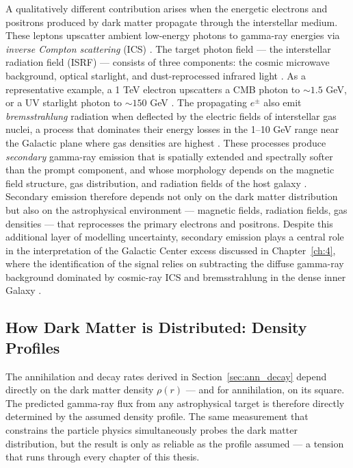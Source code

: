 A qualitatively different contribution arises when the energetic electrons and positrons produced by dark matter propagate through the interstellar medium.
These leptons upscatter ambient low-energy photons to gamma-ray energies via \textit{inverse Compton scattering} (ICS) \cite{Blumenthal:1970gc,Hooper:2024}.
The target photon field --- the interstellar radiation field (ISRF) --- consists of three components: the cosmic microwave background, optical starlight, and dust-reprocessed infrared light \cite{Strong:2007nh}.
As a representative example, a 1 TeV electron upscatters a CMB photon to $\sim 1.5$ GeV, or a UV starlight photon to $\sim 150$ GeV \cite{Cirelli:2024ssz}.
The propagating $e^\pm$ also emit \textit{bremsstrahlung} radiation when deflected by the electric fields of interstellar gas nuclei, a process that dominates their energy losses in the 1--10 GeV range near the Galactic plane where gas densities are highest \cite{Blumenthal:1970gc,Dermer:2009zz}.
These processes produce \textit{secondary} gamma-ray emission that is spatially extended and spectrally softer than the prompt component, and whose morphology depends on the magnetic field structure, gas distribution, and radiation fields of the host galaxy \cite{Strong:2007nh,Hooper:2024}.
Secondary emission therefore depends not only on the dark matter distribution but also on the astrophysical environment --- magnetic fields, radiation fields, gas densities --- that reprocesses the primary electrons and positrons.
Despite this additional layer of modelling uncertainty, secondary emission plays a central role in the interpretation of the Galactic Center excess discussed in Chapter~\ref{ch:4}, where the identification of the signal relies on subtracting the diffuse gamma-ray background dominated by cosmic-ray ICS and bremsstrahlung in the dense inner Galaxy \cite{Hooper:2024}.

\subsection{How Dark Matter is Distributed: Density Profiles}
\label{sec:density_profiles}

The annihilation and decay rates derived in Section~\ref{sec:ann_decay} depend directly on the dark matter density $\rho(r)$ --- and for annihilation, on its square.
The predicted gamma-ray flux from any astrophysical target is therefore directly determined by the assumed density profile.
The same measurement that constrains the particle physics simultaneously probes the dark matter distribution, but the result is only as reliable as the profile assumed --- a tension that runs through every chapter of this thesis.

